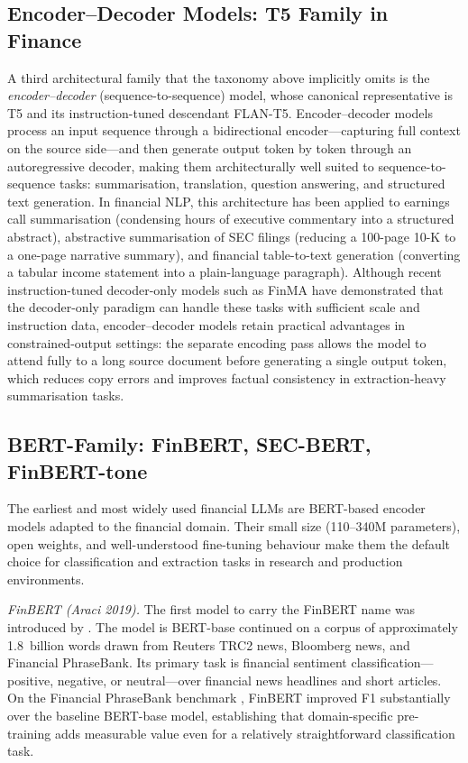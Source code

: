 \subsection{Encoder--Decoder Models: T5 Family in Finance}
\label{sec:ch08-encoder-decoder}

A third architectural family that the taxonomy above implicitly omits is the
\emph{encoder--decoder} (sequence-to-sequence) model, whose canonical
representative is T5 \cite{raffel2020t5} and its instruction-tuned descendant
FLAN-T5.  Encoder--decoder models process an input sequence through a
bidirectional encoder---capturing full context on the source side---and then
generate output token by token through an autoregressive decoder, making them
architecturally well suited to sequence-to-sequence tasks: summarisation,
translation, question answering, and structured text generation.  In financial
NLP, this architecture has been applied to earnings call summarisation (condensing
hours of executive commentary into a structured abstract), abstractive summarisation
of SEC filings (reducing a 100-page 10-K to a one-page narrative summary), and
financial table-to-text generation (converting a tabular income statement into
a plain-language paragraph).  Although recent instruction-tuned decoder-only
models such as FinMA have demonstrated that the decoder-only paradigm can handle
these tasks with sufficient scale and instruction data, encoder--decoder models
retain practical advantages in constrained-output settings: the separate encoding
pass allows the model to attend fully to a long source document before generating
a single output token, which reduces copy errors and improves factual consistency
in extraction-heavy summarisation tasks.

\subsection{BERT-Family: FinBERT, SEC-BERT, FinBERT-tone}
\label{sec:ch08-bert-family}

The earliest and most widely used financial LLMs are BERT-based
\cite{devlin2019} encoder models adapted to the financial domain.  Their small
size (110--340M parameters), open weights, and well-understood fine-tuning
behaviour make them the default choice for classification and extraction tasks
in research and production environments.

\textit{FinBERT (Araci 2019).}  The first model to carry the FinBERT name was
introduced by \citet{araci2019finbert}.  The model is BERT-base continued on a
corpus of approximately 1.8~billion words drawn from Reuters TRC2 news,
Bloomberg news, and Financial PhraseBank.  Its primary task is financial
sentiment classification---positive, negative, or neutral---over financial news
headlines and short articles.  On the Financial PhraseBank benchmark
\cite{malo2014phrasebank}, FinBERT improved F1 substantially
over the baseline BERT-base model, establishing that domain-specific pre-training
adds measurable value even for a relatively straightforward classification task.

